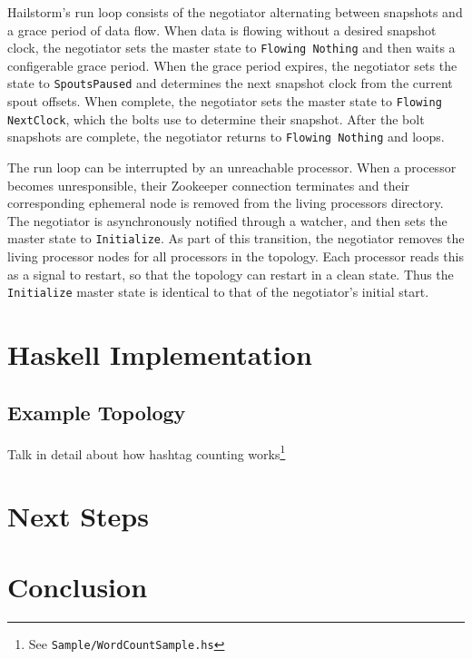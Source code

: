 \documentclass[10pt,nocopyrightspace]{sigplanconf}
\begin{document}
Hailstorm's run loop consists of the negotiator alternating between snapshots
and a grace period of data flow. When data is flowing without a desired snapshot
clock, the negotiator sets the master state to \texttt{Flowing Nothing} and
then waits a configerable grace period. When the grace period expires, the
negotiator sets the state to \texttt{SpoutsPaused} and determines the next
snapshot clock from the current spout offsets. When complete, the negotiator sets
the master state to \texttt{Flowing NextClock}, which the bolts use to determine
their snapshot. After the bolt snapshots are complete, the negotiator returns to
\texttt{Flowing Nothing} and loops.

The run loop can be interrupted by an unreachable processor. When a processor
becomes unresponsible, their Zookeeper connection terminates and their
corresponding ephemeral node is removed from the living processors directory.
The negotiator is asynchronously notified through a watcher, and then sets the
master state to \texttt{Initialize}. As part of this transition, the negotiator
removes the living processor nodes for all processors in the topology. Each
processor reads this as a signal to restart, so that the topology can restart in
a clean state. Thus the \texttt{Initialize} master state is identical to that of
the negotiator's initial start.

\section{Haskell Implementation}

\subsection{Example Topology}
Talk in detail about how hashtag counting works\footnote{See
\texttt{Sample/WordCountSample.hs}}

\section{Next Steps}

\section{Conclusion}

{}

\end{document}
